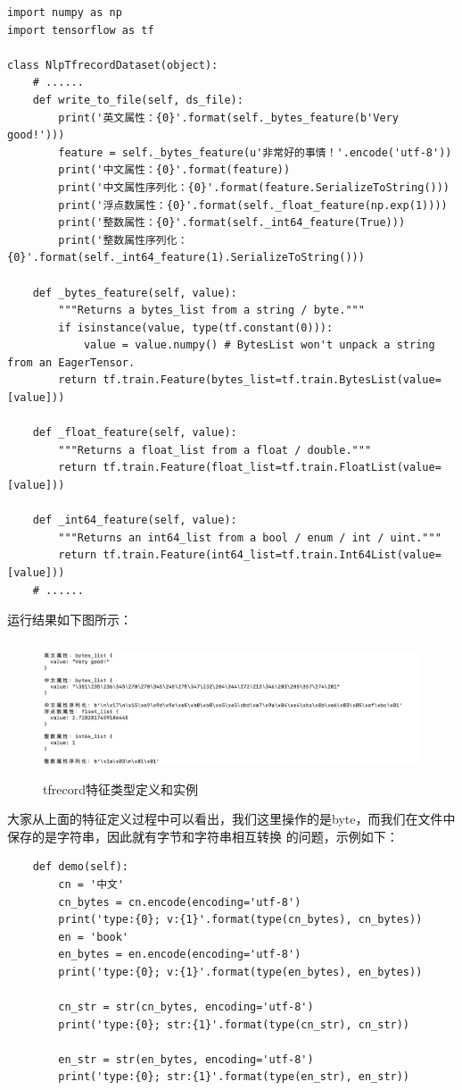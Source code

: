 \documentclass{article}
\begin{document}
\begin{lstlisting}
import numpy as np
import tensorflow as tf

class NlpTfrecordDataset(object):
    # ......
    def write_to_file(self, ds_file):
        print('英文属性：{0}'.format(self._bytes_feature(b'Very good!')))
        feature = self._bytes_feature(u'非常好的事情！'.encode('utf-8'))
        print('中文属性：{0}'.format(feature))
        print('中文属性序列化：{0}'.format(feature.SerializeToString()))
        print('浮点数属性：{0}'.format(self._float_feature(np.exp(1))))
        print('整数属性：{0}'.format(self._int64_feature(True)))
        print('整数属性序列化：{0}'.format(self._int64_feature(1).SerializeToString()))
    
    def _bytes_feature(self, value):
        """Returns a bytes_list from a string / byte."""
        if isinstance(value, type(tf.constant(0))):
            value = value.numpy() # BytesList won't unpack a string from an EagerTensor.
        return tf.train.Feature(bytes_list=tf.train.BytesList(value=[value]))

    def _float_feature(self, value):
        """Returns a float_list from a float / double."""
        return tf.train.Feature(float_list=tf.train.FloatList(value=[value]))

    def _int64_feature(self, value):
        """Returns an int64_list from a bool / enum / int / uint."""
        return tf.train.Feature(int64_list=tf.train.Int64List(value=[value]))
    # ......
\end{lstlisting}
运行结果如下图所示：
\begin{figure}[H]
    \caption{tfrecord特征类型定义和实例}
    \label{f000074}
    \centering
    \includegraphics[height=4cm]{images/f000074}
\end{figure}
大家从上面的特征定义过程中可以看出，我们这里操作的是byte，而我们在文件中保存的是字符串，因此就有字节和字符串相互转换
的问题，示例如下：
\begin{lstlisting}
    def demo(self):
        cn = '中文'
        cn_bytes = cn.encode(encoding='utf-8')
        print('type:{0}; v:{1}'.format(type(cn_bytes), cn_bytes))
        en = 'book'
        en_bytes = en.encode(encoding='utf-8')
        print('type:{0}; v:{1}'.format(type(en_bytes), en_bytes))

        cn_str = str(cn_bytes, encoding='utf-8')
        print('type:{0}; str:{1}'.format(type(cn_str), cn_str))

        en_str = str(en_bytes, encoding='utf-8')
        print('type:{0}; str:{1}'.format(type(en_str), en_str))
\end{lstlisting}
\end{document}
